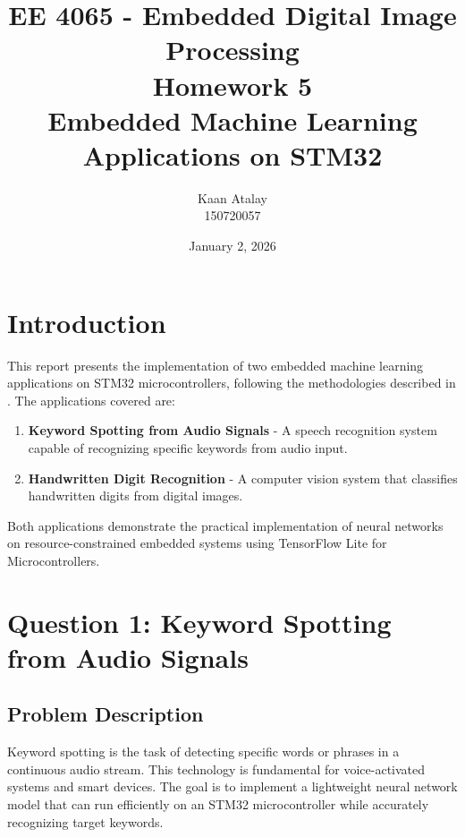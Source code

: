 \documentclass[12pt,a4paper]{article}
\title{
    \vspace{-1cm}
    \textbf{EE 4065 - Embedded Digital Image Processing}\\
    \Large Homework 5\\
    \vspace{0.5cm}
    \large Embedded Machine Learning Applications on STM32
}
\author{
    Kaan Atalay\\
    150720057
}
\date{January 2, 2026}
\begin{document}
\maketitle
\thispagestyle{empty}
\newpage

\tableofcontents
\newpage

\section{Introduction}

This report presents the implementation of two embedded machine learning applications on STM32 microcontrollers, following the methodologies described in \cite{unsalan2025}. The applications covered are:

\begin{enumerate}
    \item \textbf{Keyword Spotting from Audio Signals} - A speech recognition system capable of recognizing specific keywords from audio input.
    \item \textbf{Handwritten Digit Recognition} - A computer vision system that classifies handwritten digits from digital images.
\end{enumerate}

Both applications demonstrate the practical implementation of neural networks on resource-constrained embedded systems using TensorFlow Lite for Microcontrollers.

\section{Question 1: Keyword Spotting from Audio Signals}

\subsection{Problem Description}

Keyword spotting is the task of detecting specific words or phrases in a continuous audio stream. This technology is fundamental for voice-activated systems and smart devices. The goal is to implement a lightweight neural network model that can run efficiently on an STM32 microcontroller while accurately recognizing target keywords.
\end{document}
